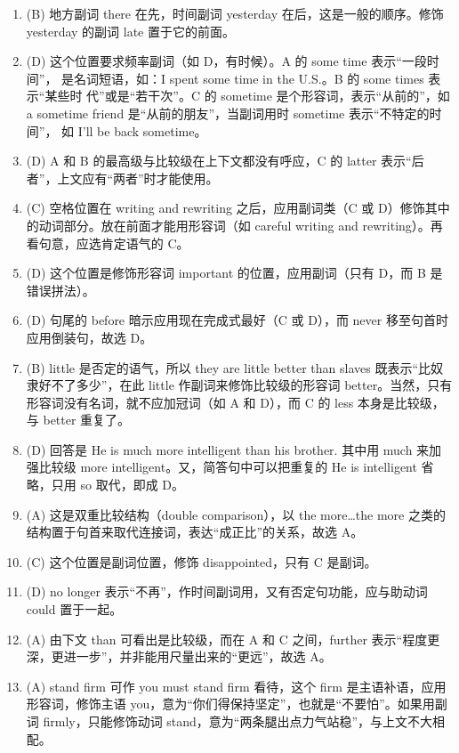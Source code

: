 \begin{enumerate}
\item (B) 地方副词 there 在先，时间副词 yesterday 在后，这是一般的顺序。修饰 yesterday 的副词 late 置于它的前面。
\item (D) 这个位置要求频率副词（如 D，有时候）。A 的 some time 表示“一段时间”，
  是名词短语，如：I spent some time in the U.S.。B 的 some times 表示“某些时
  代”或是“若干次”。C 的 sometime 是个形容词，表示“从前的”，如 a
  sometime friend 是“从前的朋友”，当副词用时 sometime 表示“不特定的时间”，
  如 I’ll be back sometime。
\item (D) A 和 B 的最高级与比较级在上下文都没有呼应，C 的 latter 表示“后者”，上文应有“两者”时才能使用。
\item (C) 空格位置在 writing and rewriting 之后，应用副词类（C 或 D）修饰其中的动词部分。放在前面才能用形容词（如 careful writing and rewriting）。再看句意，应选肯定语气的 C。
\item (D) 这个位置是修饰形容词 important 的位置，应用副词（只有 D，而 B 是错误拼法）。
\item (D) 句尾的 before 暗示应用现在完成式最好（C 或 D），而 never 移至句首时应用倒装句，故选 D。
\item (B) little 是否定的语气，所以 they are little better than slaves 既表示“比奴隶好不了多少”，在此 little 作副词来修饰比较级的形容词 better。当然，只有形容词没有名词，就不应加冠词（如 A 和 D），而 C 的 less 本身是比较级，与 better 重复了。
\item (D) 回答是 He is much more intelligent than his brother. 其中用 much 来加强比较级 more intelligent。又，简答句中可以把重复的 He is intelligent 省略，只用 so 取代，即成 D。
\item (A) 这是双重比较结构（double comparison），以 the more…the more 之类的结构置于句首来取代连接词，表达“成正比”的关系，故选 A。
\item (C) 这个位置是副词位置，修饰 disappointed，只有 C 是副词。
\item (D) no longer 表示“不再”，作时间副词用，又有否定句功能，应与助动词 could 置于一起。

\item (A) 由下文 than 可看出是比较级，而在 A 和 C 之间，further 表示“程度更深，更进一步”，并非能用尺量出来的“更远”，故选 A。

\item (A) stand firm 可作 you must stand firm 看待，这个 firm 是主语补语，应用形容词，修饰主语 you，意为“你们得保持坚定”，也就是“不要怕”。如果用副词 firmly，只能修饰动词 stand，意为“两条腿出点力气站稳”，与上文不大相配。
\end{enumerate}

